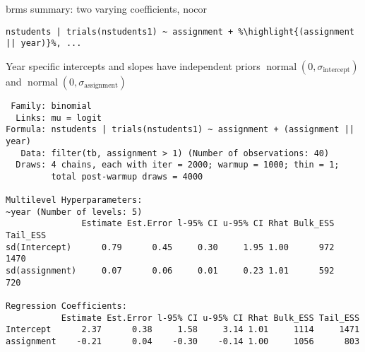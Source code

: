 \documentclass[finnish,english,t]{beamer}
\newcommand{\reducedstrut}{\vrule width 0pt height .9\ht\strutbox depth .9\dp\strutbox\relax}
\newcommand{\highlight}[1]{%
  \begingroup
  \setlength{\fboxsep}{0pt}%
  \colorbox{yellow!30}{\reducedstrut\detokenize{#1}\/}%
  \endgroup
}
\DeclareMathOperator{\normal}{normal}
\begin{document}
\begin{frame}[fragile]{brms summary: two varying coefficients, nocor}

  \vspace{-0.5\baselineskip}
\begin{verbatim}
nstudents | trials(nstudents1) ~ assignment + %\highlight{(assignment || year)}%, ...
\end{verbatim}

Year specific intercepts and slopes have independent priors $\normal(0, \sigma_\mathrm{intercept})$ and $\normal(0, \sigma_\mathrm{assignment})$

\vspace{-\baselineskip}
{\color{lightgray}\hrulefill}

\begin{verbatim}
 Family: binomial 
  Links: mu = logit 
Formula: nstudents | trials(nstudents1) ~ assignment + (assignment || year) 
   Data: filter(tb, assignment > 1) (Number of observations: 40) 
  Draws: 4 chains, each with iter = 2000; warmup = 1000; thin = 1;
         total post-warmup draws = 4000

Multilevel Hyperparameters:
~year (Number of levels: 5) 
               Estimate Est.Error l-95% CI u-95% CI Rhat Bulk_ESS Tail_ESS
sd(Intercept)      0.79      0.45     0.30     1.95 1.00      972     1470
sd(assignment)     0.07      0.06     0.01     0.23 1.01      592      720

Regression Coefficients:
           Estimate Est.Error l-95% CI u-95% CI Rhat Bulk_ESS Tail_ESS
Intercept      2.37      0.38     1.58     3.14 1.01     1114     1471
assignment    -0.21      0.04    -0.30    -0.14 1.00     1056      803
\end{verbatim}

\end{frame}
\end{document}
